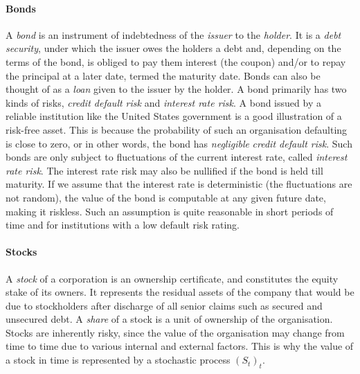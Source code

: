 \paragraph{Bonds}
A \emph{bond} is an instrument of indebtedness of the \emph{issuer} to the \emph{holder}. It is a \emph{debt security}, under which the issuer owes the holders a debt and, depending on the terms of the bond, is obliged to pay them interest (the coupon) and/or to repay the principal at a later date, termed the maturity date. Bonds can also be thought of as a \emph{loan} given to the issuer by the holder. A bond primarily has two kinds of risks, \emph{credit default risk} and \emph{interest rate risk}. A bond issued by a reliable institution like the United States government is a good illustration of a risk-free asset. This is because the probability of such an organisation defaulting is close to zero, or in other words, the bond has \emph{negligible} \emph{credit default risk}. Such bonds are only subject to fluctuations of the current interest rate, called \emph{interest rate risk}. The interest rate risk may also be nullified if the bond is held till maturity. If we assume that the interest rate is deterministic (the fluctuations are not random), the value of the bond is computable at any given future date, making it riskless. Such an assumption is quite reasonable in short periods of time and for institutions with a low default risk rating.


\paragraph{Stocks}
A \emph{stock} of a corporation is an ownership certificate, and constitutes the equity stake of its owners. It represents the residual assets of the company that would be due to stockholders after discharge of all senior claims such as secured and unsecured debt. A \emph{share} of a stock is a unit of ownership of the organisation. Stocks are inherently risky, since the value of the organisation may change from time to time due to various internal and external factors. This is why the value of a stock in time is represented by a stochastic process $ (S_t)_t $.



